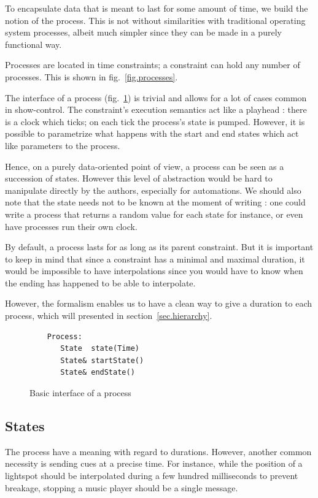 \documentclass{sigchi}
\begin{document}
To encapsulate data that is meant to last for some amount of time, we build the notion of the process. This is not without similarities with traditional operating system processes, albeit much simpler since they can be made in a purely functional way.

Processes are located in time constraints; a constraint can hold any number of processes. This is shown in fig.~\ref{fig.processes}.

The interface of a process (fig.~\ref{fig.processInterface}) is trivial and allows for a lot of cases common in show-control. The constraint's execution semantics act like a playhead : there is a clock which ticks; on each tick the process's state is pumped. However, it is possible to parametrize what happens with the start and end states which act like parameters to the process. 

Hence, on a purely data-oriented point of view, a process can be seen as a succession of states. However this level of abstraction would be hard to manipulate directly by the authors, especially for automations. We should also note that the state needs not to be known at the moment of writing : one could write a process that returns a random value for each state for instance, or even have processes run their own clock.

By default, a process lasts for as long as its parent constraint. But it is important to keep in mind that since a constraint has a minimal and maximal duration, it would be impossible to have interpolations since you would have to know when the ending has happened to be able to interpolate. 

However, the formalism enables us to have a clean way to give a duration to each process, which will presented in section~\ref{sec.hierarchy}.

\begin{figure}
	\centering
\begin{lstlisting}
    Process:
       State  state(Time)
       State& startState()
       State& endState()
\end{lstlisting}
\caption{Basic interface of a process}
\label{fig.processInterface}
\end{figure}

\subsection{States}
The process have a meaning with regard to durations. However, another common necessity is sending cues at a precise time. For instance, while the position of a lightspot should be interpolated during a few hundred milliseconds to prevent breakage, stopping a music player should be a single message.
\end{document}
